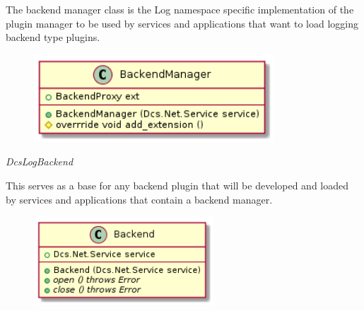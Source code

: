       \vspace*{-0.75cm}
      \begin{minipage}[t]{0.5\textwidth}
      	\vspace*{0.5cm}
        The backend manager class is the Log namespace specific implementation
        of the plugin manager to be used by services and applications that want
        to load logging backend type plugins.
      \end{minipage} \hfill
      \begin{minipage}[t]{0.45\textwidth}
        \begin{figure}[H]
          \includegraphics[width=0.8\textwidth]{figures/design/class/log/backend-manager}
          \label{fig:dsg-classes-log-backend-manager}
        \end{figure}
      \end{minipage}

      \emph{DcsLogBackend}

      \vspace*{-0.75cm}
      \begin{minipage}[t]{0.5\textwidth}
      	\vspace*{0.5cm}
        This serves as a base for any backend plugin that will be developed and
        loaded by services and applications that contain a backend manager.
      \end{minipage} \hfill
      \begin{minipage}[t]{0.45\textwidth}
        \begin{figure}[H]
          \includegraphics[width=0.6\textwidth]{figures/design/class/log/backend}
          \label{fig:dsg-classes-log-backend}
        \end{figure}
      \end{minipage}

